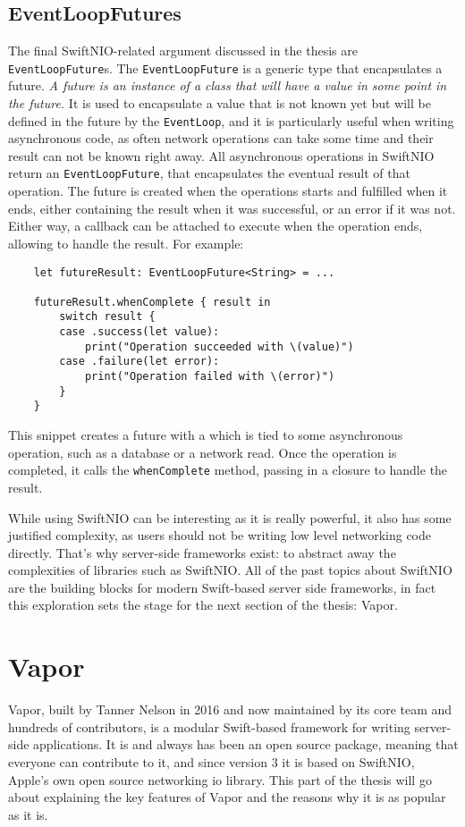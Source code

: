\subsection{EventLoopFutures}
The final SwiftNIO-related argument discussed in the thesis are \lstinline{EventLoopFuture}s. The \lstinline{EventLoopFuture} is a generic type that encapsulates a future. \textit{A future is an instance of a class that will have a value in some point in the future.}\cite{kuepper-microservices} It is used to encapsulate a value that is not known yet but will be defined in the future by the \lstinline{EventLoop}, and it is particularly useful when writing asynchronous code, as often network operations can take some time and their result can not be known right away. \cite{swiftnio-docs}
All asynchronous operations in SwiftNIO return an \lstinline{EventLoopFuture}, that encapsulates the eventual result of that operation. The future is created when the operations starts and fulfilled when it ends, either containing the result when it was successful, or an error if it was not. Either way, a callback can be attached to execute when the operation ends, allowing to handle the result. For example:
\begin{verbatim}
    let futureResult: EventLoopFuture<String> = ...
    
    futureResult.whenComplete { result in
        switch result {
        case .success(let value):
            print("Operation succeeded with \(value)")
        case .failure(let error):
            print("Operation failed with \(error)")
        }
    }
\end{verbatim}
This snippet creates a future with a  which is tied to some asynchronous operation, such as a database or a network read. Once the operation is completed, it calls the \lstinline{whenComplete} method, passing in a closure to handle the result.

While using SwiftNIO can be interesting as it is really powerful, it also has some justified complexity, as users should not be writing low level networking code directly. That's why server-side frameworks exist: to abstract away the complexities of libraries such as SwiftNIO. All of the past topics about SwiftNIO are the building blocks for modern Swift-based server side frameworks, in fact this exploration sets the stage for the next section of the thesis: Vapor.

\section{Vapor}
Vapor, built by Tanner Nelson in 2016 and now maintained by its core team and hundreds of contributors, is a modular Swift-based framework for writing server-side applications. It is and always has been an open source package, meaning that everyone can contribute to it, and since version 3 it is based on SwiftNIO, Apple's own open source networking \gls{io} library. This part of the thesis will go about explaining the key features of Vapor and the reasons why it is as popular as it is.

